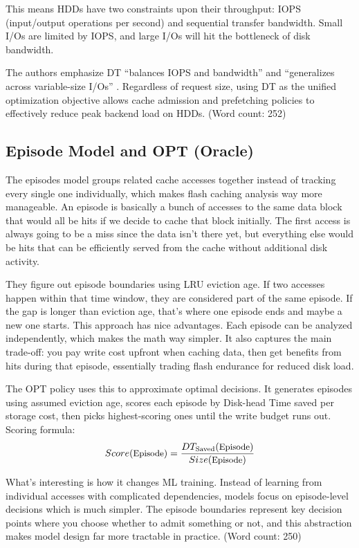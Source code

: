 This means HDDs have two constraints upon their throughput: IOPS (input/output operations per second) and sequential transfer bandwidth. Small I/Os are limited by IOPS, and large I/Os will hit the bottleneck of disk bandwidth. 

The authors emphasize DT ``balances IOPS and bandwidth'' and ``generalizes across variable-size I/Os'' \cite{wong2024baleen}. Regardless of request size, using DT as the unified optimization objective allows cache admission and prefetching policies to effectively reduce peak backend load on HDDs. ({Word count:} 252)

\subsection{Episode Model and OPT (Oracle)}
The episodes model groups related cache accesses together instead of tracking every single one individually, which makes flash caching analysis way more manageable. An episode is basically a bunch of accesses to the same data block that would all be hits if we decide to cache that block initially. The first access is always going to be a miss since the data isn't there yet, but everything else would be hits that can be efficiently served from the cache without additional disk activity.

They figure out episode boundaries using LRU eviction age. If two accesses happen within that time window, they are considered part of the same episode. If the gap is longer than eviction age, that’s where one episode ends and maybe a new one starts. This approach has nice advantages. Each episode can be analyzed independently, which makes the math way simpler. It also captures the main trade-off: you pay write cost upfront when caching data, then get benefits from hits during that episode, essentially trading flash endurance for reduced disk load.

The OPT policy uses this to approximate optimal decisions. It generates episodes using assumed eviction age, scores each episode by Disk-head Time saved per storage cost, then picks highest-scoring ones until the write budget runs out. Scoring formula:
\begin{equation}
\small
\label{eq:episode-score}
Score(\text{Episode}) = \frac{DT_{\text{Saved}}(\text{Episode})}{Size(\text{Episode})}
\end{equation}

What’s interesting is how it changes ML training. Instead of learning from individual accesses with complicated dependencies, models focus on episode-level decisions which is much simpler. The episode boundaries represent key decision points where you choose whether to admit something or not, and this abstraction makes model design far more tractable in practice. ({Word count:} 250)

